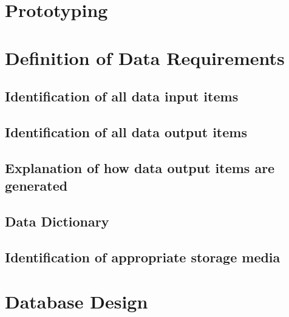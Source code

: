 \newpage

\section{Prototyping}

\section{Definition of Data Requirements}

\subsection{Identification of all data input items}

\subsection{Identification of all data output items}

\subsection{Explanation of how data output items are generated}

\subsection{Data Dictionary}

\subsection{Identification of appropriate storage media}

\section{Database Design}

\newpage

